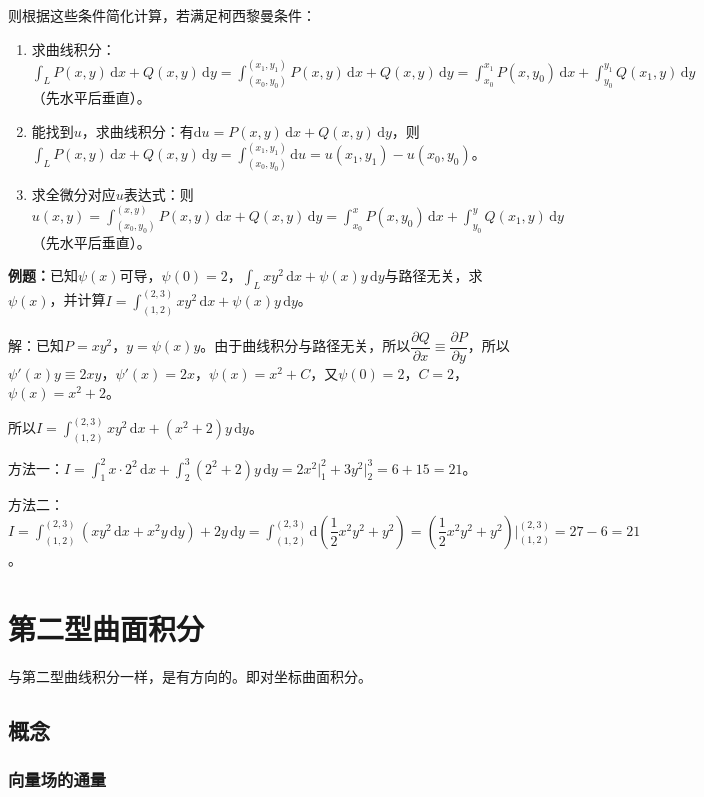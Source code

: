\documentclass[UTF8, 12pt]{ctexart}
\begin{document}
则根据这些条件简化计算，若满足柯西黎曼条件：

\begin{enumerate}
    \item 求曲线积分：$\int_LP(x,y)\,\textrm{d}x+Q(x,y)\,\textrm{d}y=\int_{(x_0,y_0)}^{(x_1,y_1)}P(x,y)\,\textrm{d}x+Q(x,y)\,\textrm{d}y=\int_{x_0}^{x_1}P(x,y_0)\,\textrm{d}x+\int_{y_0}^{y_1}Q(x_1,y)\,\textrm{d}y$（先水平后垂直）。
    \item 能找到$u$，求曲线积分：有$\textrm{d}u=P(x,y)\,\textrm{d}x+Q(x,y)\,\textrm{d}y$，则$\int_LP(x,y)\,\textrm{d}x+Q(x,y)\,\textrm{d}y=\int_{(x_0,y_0)}^{(x_1,y_1)}\textrm{d}u=u(x_1,y_1)-u(x_0,y_0)$。
    \item 求全微分对应$u$表达式：则$u(x,y)=\int_{(x_0,y_0)}^{(x,y)}P(x,y)\,\textrm{d}x+Q(x,y)\,\textrm{d}y=\int_{x_0}^xP(x,y_0)\,\textrm{d}x+\int_{y_0}^yQ(x_1,y)\,\textrm{d}y$（先水平后垂直）。
\end{enumerate}

\textbf{例题：}已知$\psi(x)$可导，$\psi(0)=2$，$\int_Lxy^2\,\textrm{d}x+\psi(x)y\,\textrm{d}y$与路径无关，求$\psi(x)$，并计算$I=\int_{(1,2)}^{(2,3)}xy^2\,\textrm{d}x+\psi(x)y\,\textrm{d}y$。

解：已知$P=xy^2$，$y=\psi(x)y$。由于曲线积分与路径无关，所以$\dfrac{\partial Q}{\partial x}\equiv\dfrac{\partial P}{\partial y}$，所以$\psi'(x)y\equiv2xy$，$\psi'(x)=2x$，$\psi(x)=x^2+C$，又$\psi(0)=2$，$C=2$，$\psi(x)=x^2+2$。

所以$I=\int_{(1,2)}^{(2,3)}xy^2\,\textrm{d}x+(x^2+2)y\,\textrm{d}y$。

方法一：$I=\int_1^2x\cdot2^2\,\textrm{d}x+\int_2^3(2^2+2)y\,\textrm{d}y=2x^2\vert_1^2+3y^2\vert_2^3=6+15=21$。

方法二：$I=\int_{(1,2)}^{(2,3)}(xy^2\,\textrm{d}x+x^2y\,\textrm{d}y)+2y\,\textrm{d}y=\int_{(1,2)}^{(2,3)}\textrm{d}(\dfrac{1}{2}x^2y^2+y^2)=(\dfrac{1}{2}x^2y^2+y^2)|_{(1,2)}^{(2,3)}=27-6=21$。

\section{第二型曲面积分}

与第二型曲线积分一样，是有方向的。即对坐标曲面积分。

\subsection{概念}

\subsubsection{向量场的通量}
\end{document}

